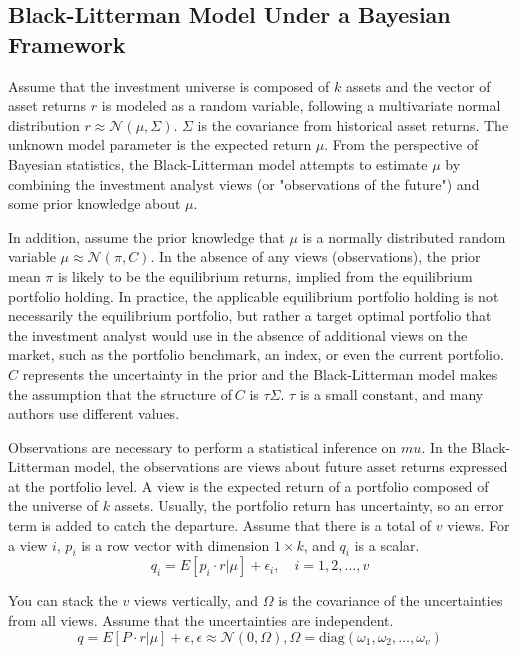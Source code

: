 \subsection{Black-Litterman Model Under a Bayesian Framework}
Assume that the investment universe is composed of $k$ assets and the vector of asset returns $r$ is modeled as a random variable, following a multivariate normal distribution $r\approx\mathcal{N}(\mu,\Sigma)$. $\Sigma$ is the covariance from historical asset returns. The unknown model parameter is the expected return $\mu$. From the perspective of Bayesian statistics, the Black-Litterman model attempts to estimate $\mu$ by combining the investment analyst views (or "observations of the future") and some prior knowledge about $\mu$.

In addition, assume the prior knowledge that $\mu$ is a normally distributed random variable $\mu\approx\mathcal{N}(\pi,C)$. In the absence of any views (observations), the prior mean $\pi$ is likely to be the equilibrium returns, implied from the equilibrium portfolio holding.
In practice, the applicable equilibrium portfolio holding is not necessarily the equilibrium portfolio, but rather a target optimal portfolio that the investment analyst would use in the absence of additional views on the market, such as the portfolio benchmark, an index, or even the current portfolio. $C$ represents the uncertainty in the prior and the Black-Litterman model makes the assumption that the structure of $C$ is $\tau\Sigma$. $\tau$ is a small constant, and many authors use different values. %

Observations are necessary to perform a statistical inference on $mu$. In the Black-Litterman model, the observations are views about future asset returns expressed at the portfolio level. A view is the expected return of a portfolio composed of the universe of $k$ assets. Usually, the portfolio return has uncertainty, so an error term is added to catch the departure. Assume that there is a total of $v$ views. For a view $i$, $p_i$
is a row vector with dimension $1\times k$, and $q_i$ is a scalar.
\begin{equation}
  q_i = \mathbb{Ε}[p_i\cdot r|\mu]+\epsilon_i,\quad i=1,2,...,v
\end{equation}

You can stack the $v$ views vertically, and $\Omega$ is the covariance of the uncertainties from all views. Assume that the uncertainties are independent.
\begin{equation}
q = \mathbb{Ε}[P\cdot r| \mu]+ \epsilon,  \epsilon\approx\mathcal{N}(0, \Omega),  \Omega= \text{diag}(\omega_1, \omega_2,\ldots,\omega_v)
\end{equation}

